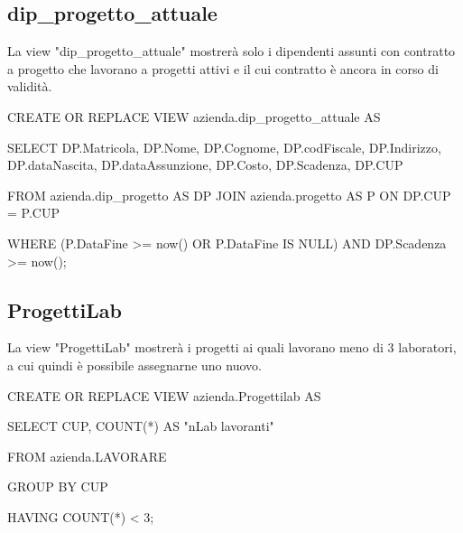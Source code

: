         \subsection{dip\_progetto\_attuale}
        La view "dip\_progetto\_attuale" mostrerà solo i dipendenti assunti con contratto a progetto che lavorano a progetti attivi e il cui contratto è ancora in corso di validità.
            \ttfamily
                \begin{flushleft}
                    \begin{description}
                        \item CREATE OR REPLACE VIEW azienda.dip\_progetto\_attuale AS
                        \item SELECT DP.Matricola, DP.Nome, DP.Cognome, DP.codFiscale, DP.Indirizzo, DP.dataNascita, DP.dataAssunzione, DP.Costo, DP.Scadenza, DP.CUP      
                        \item FROM azienda.dip\_progetto AS DP JOIN azienda.progetto AS P ON DP.CUP = P.CUP
                        \item WHERE (P.DataFine >= now() OR P.DataFine IS NULL) AND DP.Scadenza >= now();
                    \end{description}
                \end{flushleft}
            \normalfont


	\subsection{ProgettiLab}
        La view "ProgettiLab" mostrerà i progetti ai quali lavorano meno di 3 laboratori, a cui quindi è possibile assegnarne uno nuovo.
            \ttfamily
                \begin{flushleft}
                    \begin{description}
                        \item CREATE OR REPLACE VIEW azienda.Progettilab AS
                        \item SELECT CUP, COUNT(*) AS "nLab lavoranti"
                        \item FROM azienda.LAVORARE
                        \item GROUP BY CUP
                        \item HAVING COUNT(*) < 3;
                    \end{description}
                \end{flushleft}
            \normalfont


